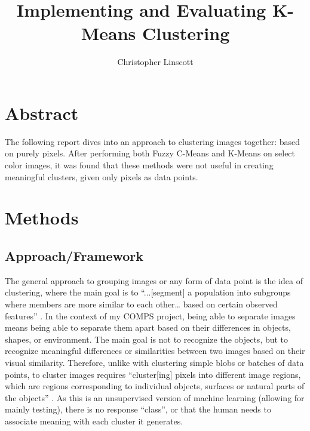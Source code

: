 \documentclass[10pt,twocolumn]{article}
\title{Implementing and Evaluating K-Means Clustering}
\author{Christopher Linscott}
\affiliation{Occidental College}
\begin{document}
\maketitle


\section {Abstract}
\indent
The following report dives into an approach to clustering images together: based on purely pixels. After performing both Fuzzy C-Means and K-Means on select color images, it was found that these methods were not useful in creating meaningful clusters, given only pixels as data points.

\section {Methods}

\subsection {Approach/Framework}

The general approach to grouping images or any form of data point is the idea of clustering, where the main goal is to “...[segment] a population into subgroups where members are more similar to each other… based on certain observed features” \cite{C3Clustering}. In the context of my COMPS project, being able to separate images means being able to separate them apart based on their differences in objects, shapes, or environment. The main goal is not to recognize the objects, but to recognize meaningful differences or similarities between two images based on their visual similarity. Therefore, unlike with clustering simple blobs or batches of data points, to cluster images requires “cluster[ing] pixels into different image regions, which are regions corresponding to individual objects, surfaces or natural parts of the objects” \cite{Roy2014}. As this is an unsupervised version of machine learning (allowing for mainly testing), there is no response “class”, or that the human needs to associate meaning with each cluster it generates.
\end{document}
